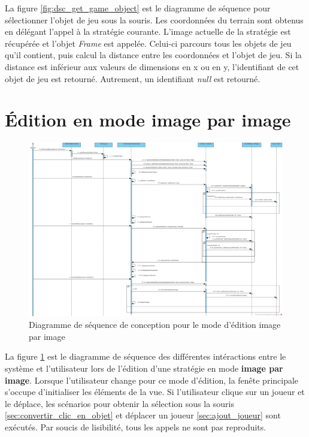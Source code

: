 La figure \ref{fig:dsc_get_game_object} est le diagramme de séquence pour sélectionner l'objet de jeu sous la souris.
Les coordonnées du terrain sont obtenus en délégant l'appel à la stratégie courante.
L'image actuelle de la stratégie est récupérée et l'objet \textit{Frame} est appelée.
Celui-ci parcours tous les objets de jeu qu'il contient, puis calcul la distance entre les coordonnées et l'objet de jeu.
Si la distance est inférieur aux valeurs de dimensions en x ou en y, l'identifiant de cet objet de jeu est retourné.
Autrement, un identifiant \textit{null} est retourné.

\section{Édition en mode image par image}
\label{sec:edition_image_par_image}

\begin{figure}[htpb]
    \centering
    \includegraphics[scale=0.3]{fig/dsc_edition_image_par_image.png}
    \caption{Diagramme de séquence de conception pour le mode d'édition image par image}
    \label{fig:dsc_edit_image}
\end{figure}

La figure \ref{fig:dsc_edit_image} est le diagramme de séquence des différentes intéractions entre le système et l'utilisateur lors de l'édition d'une stratégie en mode \textbf{image par image}.
Lorsque l'utilisateur change pour ce mode d'édition, la fenête principale s'occupe d'initialiser les éléments de la vue.
Si l'utilisateur clique sur un joueur et le déplace, les scénarios pour obtenir la sélection sous la souris \ref{sec:convertir_clic_en_objet} et déplacer un joueur \ref{sec:ajout_joueur} sont exécutés.
Par soucis de lisibilité, tous les appels ne sont pas reproduits.

